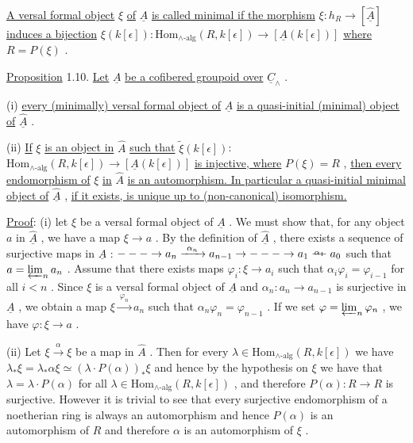 \underline{A versal formal object} $\xi$ \underline{of} $\underline{A}$ \underline{is called minimal if the morphism} $\xi : h_R \to [\hat{\underline{A}}]$ \underline{induces a bijection} $\xi(k[\epsilon]) : \mathrm{Hom}_{\wedge\text{-alg}}(R,k[\epsilon]) \to [\underline{A}(k[\epsilon])]$ \underline{where} $R = P(\xi)$ .

\underline{Proposition} 1.10.  \underline{Let} $\underline{A}$ \underline{be a cofibered groupoid over} $\underline{C}_{\wedge}$ .

  (i)  \underline{every (minimally) versal formal object of} $\underline{A}$ \underline{is a quasi-initial (minimal) object of} $\hat{\underline{A}}$ .

  (ii) \underline{If} $\xi$ \underline{is an object in} $\hat{A}$ \underline{such that} $\widetilde{\xi}(k[\epsilon])$: $\mathrm{Hom}_{\wedge\text{-alg}}(R,k[\epsilon])\to [\underline{A}(k[\epsilon])]$ \underline{is injective, where} $P(\xi) = R$ , \underline{then every endomorphism of} $\xi$ \underline{in} $\hat{A}$ \underline{is an automorphism. In particular a quasi-initial minimal object of} $\hat{\underline{A}}$ , \underline{if it exists, is unique up to (non-canonical) isomorphism.}

\underline{Proof}: (i) let $\xi$ be a versal formal object of $\underline{A}$ . We must show that, for any object $a$ in $\hat{\underline{A}}$ , we have a map $\xi \to a$ . By the definition of $\hat{\underline{A}}$ , there exists a sequence of surjective maps in $\underline{A}$ : $--- \to a_n \xrightarrow{\ \alpha_n\ } a_{n-1} \to --- \to a_1 \overset{\alpha_1}{\relbar\joinrel\relbar} a_0$ such that $a = \varprojlim_n a_n$ . Assume that there exists maps $\varphi_i : \xi \to a_i$ such that $\alpha_i\varphi_i = \varphi_{i-1}$ for all $i < n$ . Since $\xi$ is a versal formal object of $\underline{A}$ and $\alpha_n : a_n \to a_{n-1}$ is surjective in $\underline{A}$ , we obtain a map $\xi \xrightarrow{\ \varphi_n\ } a_n$ such that $\alpha_n\varphi_n = \varphi_{n-1}$ . If we set $\varphi = \varprojlim_n \varphi_n$ , we have $\varphi : \xi \to a$ .

(ii) Let $\xi \xrightarrow{\ \alpha\ } \xi$ be a map in $\hat{A}$ . Then for every $\lambda \in \mathrm{Hom}_{\wedge\text{-alg}}(R,k[\epsilon])$ we have $\lambda_*\xi = \lambda_*\alpha\xi \simeq (\lambda\cdot P(\alpha))_*\xi$ and hence by the hypothesis on $\xi$ we have that $\lambda = \lambda\cdot P(\alpha)$ for all $\lambda \in \mathrm{Hom}_{\wedge\text{-alg}}(R,k[\epsilon])$ , and therefore $P(\alpha) : R \to R$ is surjective. However it is trivial to see that every surjective endomorphism of a noetherian ring is always an automorphism and hence $P(\alpha)$ is an automorphism of $R$ and therefore $\alpha$ is an automorphism of $\xi$ .

